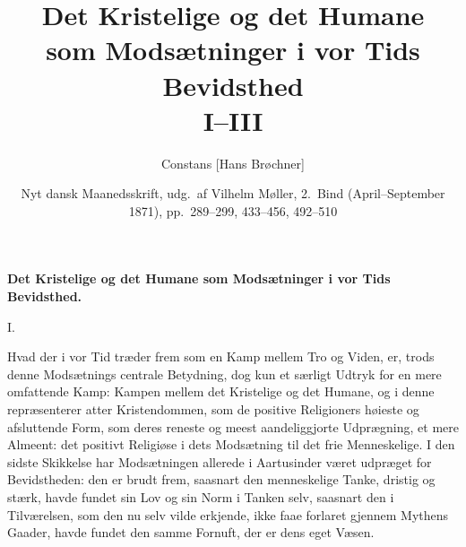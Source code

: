 \documentclass[12pt,a4paper,openany]{book}
\title{\textbf{Det Kristelige og det Humane\\ som Modsætninger i vor Tids Bevidsthed}\\[6pt]\large I--III}
\author{Constans [Hans Brøchner]}
\date{Nyt dansk Maanedsskrift, udg.\ af Vilhelm Møller,
  2.\ Bind (April--September 1871), pp.~289--299, 433--456, 492--510}
\newcommand{\secnum}[1]{\par\begin{center}#1\end{center}\par\nobreak}
\newcommand{\opage}[1]{\marginnote{\footnotesize\textit{[#1]}}}
\begin{document}
\maketitle
\thispagestyle{empty}
\clearpage

\opage{289}\begin{center}\textbf{\large Det Kristelige og det Humane som Modsætninger i vor Tids Bevidsthed.}\end{center}

\secnum{I.}

Hvad der i vor Tid træder frem som en Kamp mellem
Tro og Viden, er, trods denne Modsætnings centrale Betydning,
dog kun et særligt Udtryk for en mere omfattende
Kamp: Kampen mellem det Kristelige og det Humane, og i
denne repræsenterer atter Kristendommen, som de positive
Religioners høieste og afsluttende Form, som deres reneste
og meest aandeliggjorte Udprægning, et mere Almeent: det
positivt Religiøse i dets Modsætning til det frie Menneskelige.
I den sidste Skikkelse har Modsætningen allerede i
Aartusinder været udpræget for Bevidstheden: den er brudt
frem, saasnart den menneskelige Tanke, dristig og stærk, havde
fundet sin Lov og sin Norm i Tanken selv, saasnart den i
Tilværelsen, som den nu selv vilde erkjende, ikke faae
forlaret gjennem Mythens Gaader, havde fundet den samme
Fornuft, der er dens eget Væsen.
\end{document}
